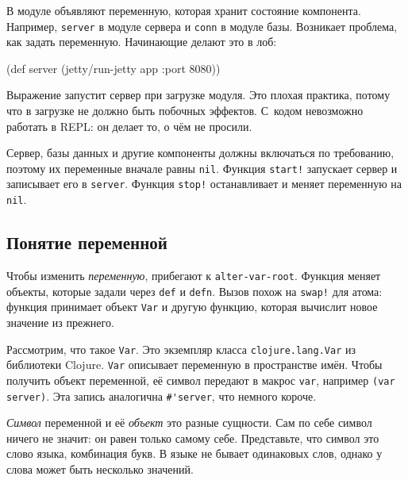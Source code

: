 В модуле объявляют переменную, которая хранит состояние компонента. Например,
\verb|server| в модуле сервера и \verb|conn| в модуле базы. Возникает проблема,
как задать переменную. Начинающие делают это в лоб:

\begin{english}
  \begin{clojure}
(def server (jetty/run-jetty app {:port 8080}))
  \end{clojure}
\end{english}

Выражение запустит сервер при загрузке модуля. Это плохая практика, потому что в
загрузке не должно быть побочных эффектов. С~кодом невозможно работать в REPL:
он делает то, о чём не просили.

Сервер, базы данных и другие компоненты должны включаться по требованию, поэтому
их переменные вначале равны \verb|nil|. Функция \verb|start!| запускает
сервер и записывает его в \verb|server|. Функция \verb|stop!| останавливает
и меняет переменную на \verb|nil|.

\subsection{Понятие переменной}


\label{var-section}

Чтобы изменить \emph{переменную}, прибегают к \verb|alter-var-root|. Функция
меняет объекты, которые задали через \verb|def| и \verb|defn|. Вызов похож
на \verb|swap!| для атома: функция принимает объект \verb|Var| и другую
функцию, которая вычислит новое значение из прежнего.


Рассмотрим, что такое \verb|Var|. Это экземпляр класса \verb|clojure.lang.Var|
из библиотеки Clojure. \verb|Var| описывает переменную в пространстве имён.
Чтобы получить объект переменной, её символ передают в макрос \verb|var|,
например \verb|(var server)|. Эта запись аналогична \verb|#'server|,
что немного короче.



\emph{Символ} переменной и её \emph{объект} это разные сущности. Сам по себе
символ ничего не значит: он равен только самому себе. Представьте, что символ
это слово языка, комбинация букв. В языке не бывает одинаковых слов, однако у
слова может быть несколько значений.

